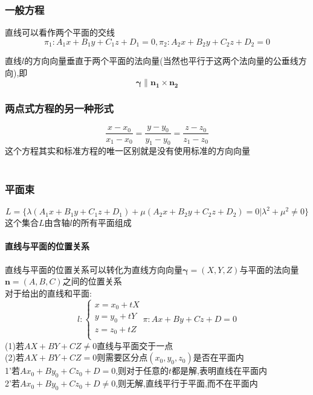 \documentclass{article}
\newcommand{\ve}{\boldsymbol}
\begin{document}
\begin{CJK}{UTF8}{gkai}
\subsubsection*{一般方程}
直线可以看作两个平面的交线\\
\begin{equation*}
    \pi_1:
        A_1x+B_1y+C_1z+D_1=0
    ,\pi_2:
        A_2x+B_2y+C_2z+D_2=0
\end{equation*}

直线$l$的方向向量垂直于两个平面的法向量(当然也平行于这两个法向量的公垂线方向),即\\
\[\ve{\gamma}\parallel\ve{n_1}\times\ve{n_2}\]
\subsubsection*{两点式方程的另一种形式}
\[\dfrac{x-x_0}{x_1-x_0}=\dfrac{y-y_0}{y_1-y_0}=\dfrac{z-z_0}{z_1-z_0}\]
这个方程其实和标准方程的唯一区别就是没有使用标准的方向向量\\\
\subsubsection*{平面束}
\[L=\{\lambda(A_1x+B_1y+C_1z+D_1)+\mu(A_2x+B_2y+C_2z+D_2)=0|\lambda^2+\mu^2\neq 0\}\]
这个集合$L$由含轴$l$的所有平面组成\\
\paragraph{直线与平面的位置关系\\}
直线与平面的位置关系可以转化为直线方向向量$\ve{\gamma}=(X,Y,Z)$与平面的法向量$\ve{n}=(A,B,C)$之间的位置关系\\
对于给出的直线和平面:\\
\begin{equation*}
l:
\begin{cases}
x=x_0+tX\\
y=y_0+tY\\
z=z_0+tZ\\
\end{cases}
\pi:
Ax+By+Cz+D=0
\end{equation*}
(1)若$AX+BY+CZ\neq 0$直线与平面交于一点\\
(2)若$AX+BY+CZ  =  0$则需要区分点$(x_0,y_0,z_0)$是否在平面内\\
1'若$Ax_0+By_0+Cz_0+D=0$,则对于任意的$t$都是解,表明直线在平面内\\
2'若$Ax_0+By_0+Cz_0+D\neq 0$,则无解,直线平行于平面,而不在平面内\\

\end{CJK}
\end{document}
